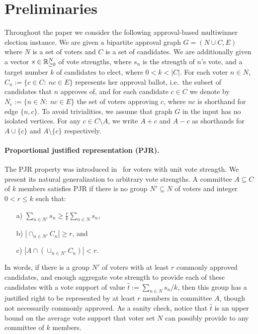 \section{Preliminaries}\label{s:prel}

Throughout the paper we consider the following approval-based multiwinner election instance. 
We are given a bipartite approval graph $G=(N\cup C, E)$ where $N$ is a set of voters and $C$ is a set of candidates. 
We are additionally given a vector $s\in\mathbb{R}_{\geq 0}^N$ of vote strengths, where $s_n$ is the strength of $n$'s vote, and a target number $k$ of candidates to elect, where $0< k<|C|$.
For each voter $n\in N$, $C_n:=\{c\in C: \ nc\in E\}$ represents her approval ballot, i.e.~the subset of candidates that $n$ approves of, and for each candidate $c\in C$ we denote by $N_c:=\{n\in N: \ nc\in E\}$ the set of voters approving $c$, where $nc$ is shorthand for edge $\{n,c\}$. 
To avoid trivialities, we assume that graph $G$ in the input has no isolated vertices. 
For any $c\in C\setminus A$, we write $A+c$ and $A-c$ as shorthands for $A\cup\{c\}$ and $A\setminus \{c\}$ respectively. 

\paragraph{Proportional justified representation (PJR).} 
The PJR property was introduced in~\cite{sanchez2017proportional} for voters with unit vote strength. We present its natural generalization to arbitrary vote strengths. A committee $A\subseteq C$ of $k$ members satisfies PJR if there is no group $N'\subseteq N$ of voters and integer $0<r\leq k$ such that:
\begin{itemize}
\item[a)] $\sum_{n\in N'} s_n \geq \frac{r}{k} \sum_{n\in N}s_n$,
\item[b)] $|\cap_{n\in N'} C_n|\geq r$, and
\item[c)] $|A\cap (\cup_{n\in N'} C_n)|<r$.
\end{itemize}

In words, if there is a group $N'$ of voters with at least $r$ commonly approved candidates, and enough aggregate vote strength to provide each of these candidates with a vote support of value $\hat{t}:=\sum_{n\in N} s_n / k$, then this group has a justified right to be represented by at least $r$ members in committee $A$, though not necessarily commonly approved. As a sanity check, notice that $\hat{t}$ is an upper bound on the average vote support that voter set $N$ can possibly provide to any committee of $k$ members. 


